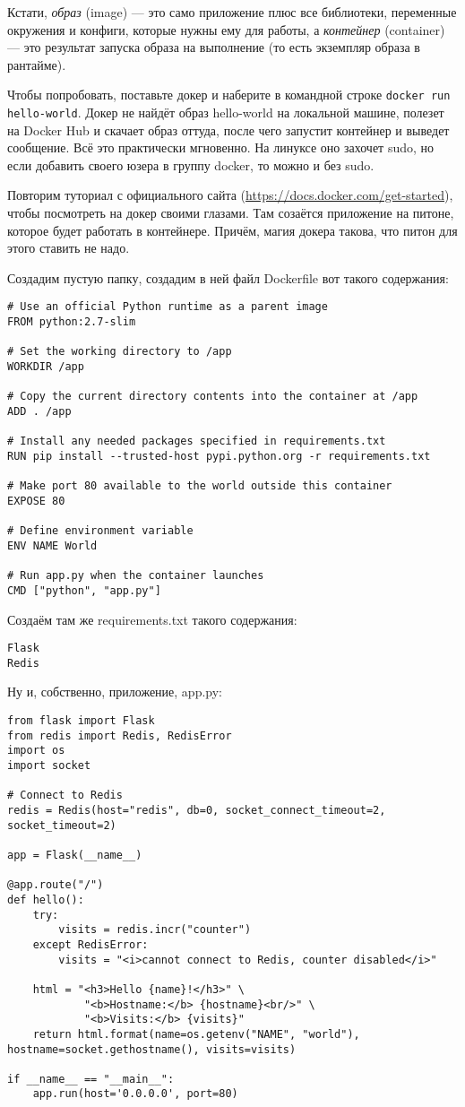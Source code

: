 \documentclass[a5paper]{article}
\begin{document}
Кстати, \textit{образ} (image) --- это само приложение плюс все библиотеки, переменные окружения и конфиги, которые нужны ему для работы, а \textit{контейнер} (container) --- это результат запуска образа 
на выполнение (то есть экземпляр образа в рантайме).

Чтобы попробовать, поставьте докер и наберите в командной строке \verb|docker run hello-world|. Докер не найдёт образ hello-world на локальной машине, полезет на Docker Hub и скачает образ оттуда,
после чего запустит контейнер и выведет сообщение. Всё это практически мгновенно. На линуксе оно захочет sudo, но если добавить своего юзера в группу docker, то можно и без sudo.

Повторим туториал с официального сайта (\url{https://docs.docker.com/get-started}), чтобы посмотреть на докер своими глазами. Там созаётся приложение на питоне, которое будет работать в контейнере. Причём, магия
докера такова, что питон для этого ставить не надо.

Создадим пустую папку, создадим в ней файл Dockerfile вот такого содержания:
\begin{verbatim}
# Use an official Python runtime as a parent image
FROM python:2.7-slim

# Set the working directory to /app
WORKDIR /app

# Copy the current directory contents into the container at /app
ADD . /app

# Install any needed packages specified in requirements.txt
RUN pip install --trusted-host pypi.python.org -r requirements.txt

# Make port 80 available to the world outside this container
EXPOSE 80

# Define environment variable
ENV NAME World

# Run app.py when the container launches
CMD ["python", "app.py"]
\end{verbatim}

Создаём там же requirements.txt такого содержания:
\begin{verbatim}
Flask
Redis
\end{verbatim}

Ну и, собственно, приложение, app.py:
\begin{verbatim}
from flask import Flask
from redis import Redis, RedisError
import os
import socket

# Connect to Redis
redis = Redis(host="redis", db=0, socket_connect_timeout=2, socket_timeout=2)

app = Flask(__name__)

@app.route("/")
def hello():
    try:
        visits = redis.incr("counter")
    except RedisError:
        visits = "<i>cannot connect to Redis, counter disabled</i>"

    html = "<h3>Hello {name}!</h3>" \
            "<b>Hostname:</b> {hostname}<br/>" \
            "<b>Visits:</b> {visits}"
    return html.format(name=os.getenv("NAME", "world"), hostname=socket.gethostname(), visits=visits)

if __name__ == "__main__":
    app.run(host='0.0.0.0', port=80)
\end{verbatim}
\end{document}
